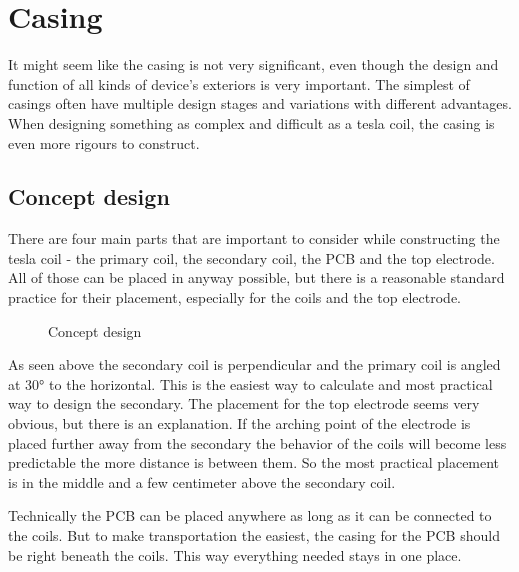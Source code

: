 \chapter{Casing}

It might seem like the casing is not very significant, even though the design and function of all kinds of device's exteriors is very important. The simplest of casings often have multiple design stages and variations with different advantages. When designing something as complex and difficult as a tesla coil, the casing is even more rigours to construct. 


\section{Concept design}

There are four main parts that are important to consider while constructing the tesla coil - the primary coil, the secondary coil, the PCB and the top electrode. All of those can be placed in anyway possible, but there is a reasonable standard practice for their placement, especially for the coils and the top electrode. 

\begin{figure}
    \centering
    \caption{Concept design}
    \label{BD-envision}
\end{figure}

As seen above the secondary coil is perpendicular and the primary coil is angled at 30° to the horizontal. This is the easiest way to calculate and most practical way to design the secondary. The placement for the top electrode seems very obvious, but there is an explanation. If the arching point of the electrode is placed further away from the secondary the behavior of the coils will become less predictable the more distance is between them. So the most practical placement is in the middle and a few centimeter above the secondary coil. 

Technically the PCB can be placed anywhere as long as it can be connected to the coils. But to make transportation the easiest, the casing for the PCB should be right beneath the coils. This way everything needed stays in one place. 

